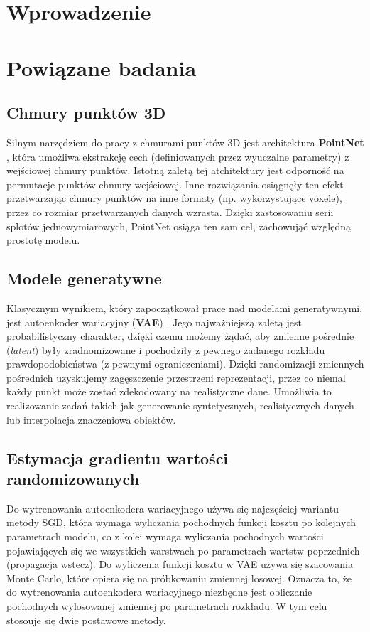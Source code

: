 \documentclass{iithesis}
\author         {Jakub Zadrożny}
\date           {6 września 2019}
\begin{document}
\chapter{Wprowadzenie}

\chapter{Powiązane badania}

\section{Chmury punktów 3D}
\label{sec:related_pointnet}
Silnym narzędziem do pracy z chmurami punktów 3D jest architektura \textbf{PointNet} \cite{pointnet},
która umożliwa ekstrakcję cech (definiowanych przez wyuczalne parametry) z wejściowej chmury punktów.
Istotną zaletą tej atchitektury jest odporność na permutacje punktów chmury wejściowej.
Inne rozwiązania osiągnęły ten efekt przetwarzając chmury punktów na inne formaty (np. wykorzystujące voxele),
przez co rozmiar przetwarzanych danych wzrasta. Dzięki zastosowaniu serii splotów jednowymiarowych,
PointNet osiąga ten sam cel, zachowująć względną prostotę modelu.

\section{Modele generatywne}
Klasycznym wynikiem, który zapoczątkował prace nad modelami generatywnymi, jest autoenkoder wariacyjny
(\textbf{VAE}) \cite{vae}. Jego najważniejszą zaletą jest probabilistyczny charakter,
dzięki czemu możemy żądać, aby zmienne pośrednie (\textit{latent}) były zradnomizowane i pochodziły
z pewnego zadanego rozkładu prawdopodobieństwa (z pewnymi ograniczeniami).
Dzięki randomizacji zmiennych pośrednich uzyskujemy zagęszczenie przestrzeni reprezentacji,
przez co niemal każdy punkt może zostać zdekodowany na realistyczne dane.
Umożliwia to realizowanie zadań takich jak generowanie syntetycznych,
realistycznych danych lub interpolacja znaczeniowa obiektów.

\section{Estymacja gradientu wartości randomizowanych}
Do wytrenowania autoenkodera wariacyjnego używa się najczęściej wariantu metody SGD, która
wymaga wyliczania pochodnych funkcji kosztu po kolejnych parametrach modelu, co z kolei
wymaga wyliczania pochodnych wartości pojawiających się we wszystkich warstwach po parametrach
wartstw poprzednich (propagacja wstecz).
Do wyliczenia funkcji kosztu w VAE używa się szacowania Monte Carlo, które opiera się na
próbkowaniu zmiennej losowej. Oznacza to, że do wytrenowania autoenkodera wariacyjnego
niezbędne jest obliczanie pochodnych wylosowanej zmiennej po parametrach rozkładu.
W tym celu stosouje się dwie postawowe metody.
\end{document}
